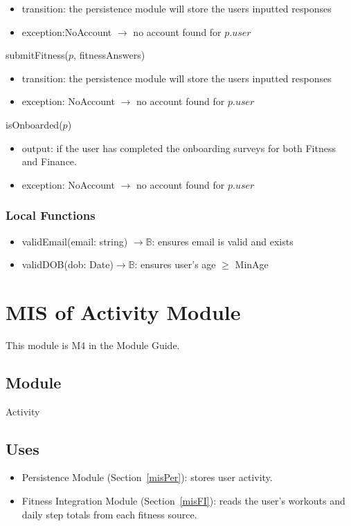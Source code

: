 \documentclass[12pt, titlepage]{article}
\begin{document}
\begin{itemize}
    \item transition: the persistence module will store the users inputted responses
    \item exception:NoAccount $\longrightarrow$ no account found for $p.\mathit{user}$
\end{itemize}
\noindent submitFitness($p$, fitnessAnswers)
\begin{itemize}
    \item transition: the persistence module will store the users inputted responses
    \item exception: NoAccount $\longrightarrow$ no account found for $p.\mathit{user}$
\end{itemize}
\noindent isOnboarded($p$)
\begin{itemize}
    \item output: if the user has completed the onboarding surveys for both Fitness and Finance.
    \item exception: NoAccount $\longrightarrow$ no account found for $p.\mathit{user}$
\end{itemize}

\subsubsection{Local Functions}
\begin{itemize}
    \item validEmail(email: string) $\longrightarrow \mathbb{B}$: ensures email is valid and exists
    \item validDOB(dob: Date)$\longrightarrow \mathbb{B}$: ensures user's age $\geq$ MinAge 
\end{itemize}

\section{MIS of Activity Module} \label{misAct}

This module is M4 in the Module Guide.

\subsection{Module}
Activity 

\subsection{Uses}
\begin{itemize}
    \item Persistence Module (Section~\ref{misPer}): stores user activity.
    \item Fitness Integration Module (Section~\ref{misFI}): reads the user's
      workouts and daily step totals from each fitness source.
\end{itemize}
\end{document}
